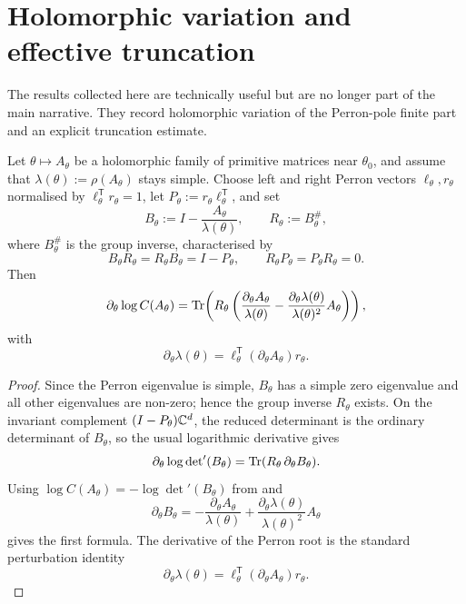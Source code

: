\section{Holomorphic variation and effective truncation}
\label{app:variation}

The results collected here are technically useful but are no longer part of the main narrative. They record holomorphic variation of the Perron-pole finite part and an explicit truncation estimate.

\begin{theorem}
  \label{thm:finite-part-reduced-determinant-group-inverse-gradient}
  Let \(\theta\mapsto A_\theta\) be a holomorphic family of primitive
  matrices near \(\theta_0\), and assume that
  \(\lambda(\theta):=\rho(A_\theta)\) stays simple. Choose left and
  right Perron vectors \(\ell_\theta,r_\theta\) normalised by
  \(\ell_\theta^{\mathsf T}r_\theta=1\), let
  \(P_\theta:=r_\theta\ell_\theta^{\mathsf T}\), and set
  \[
    B_\theta:=I-\frac{A_\theta}{\lambda(\theta)},
    \qquad
    R_\theta:=B_\theta^{\#},
  \]
  where \(B_\theta^{\#}\) is the group inverse, characterised by
  \[
    B_\theta R_\theta=R_\theta B_\theta=I-P_\theta,
    \qquad
    R_\theta P_\theta=P_\theta R_\theta=0.
  \]
  Then
  \[
    \partial_\theta\log C(A_\theta)
    =\operatorname{Tr}\!\left(
      R_\theta\left(
        \frac{\partial_\theta A_\theta}{\lambda(\theta)}
        -\frac{\partial_\theta\lambda(\theta)}{\lambda(\theta)^2}
         A_\theta\right)\right),
  \]
  with
  \[
    \partial_\theta\lambda(\theta)
    =\ell_\theta^{\mathsf T}(\partial_\theta A_\theta)r_\theta.
  \]
\end{theorem}

\begin{proof}
  Since the Perron eigenvalue is simple, \(B_\theta\) has a simple zero
  eigenvalue and all other eigenvalues are non-zero; hence the group
  inverse \(R_\theta\) exists. On the invariant complement
  \((I-P_\theta)\mathbb{C}^d\), the reduced determinant is the ordinary
  determinant of \(B_\theta\), so the usual logarithmic derivative gives
  \[
    \partial_\theta \log\det\nolimits'(B_\theta)
    =\operatorname{Tr}(R_\theta\,\partial_\theta B_\theta).
  \]
  Using \(\log C(A_\theta)=-\log\det\nolimits'(B_\theta)\) from
   and
  \[
    \partial_\theta B_\theta
    =-\frac{\partial_\theta A_\theta}{\lambda(\theta)}
      +\frac{\partial_\theta\lambda(\theta)}{\lambda(\theta)^2}A_\theta
  \]
  gives the first formula. The derivative of the Perron root is the
  standard perturbation identity
  \[
    \partial_\theta\lambda(\theta)
    =\ell_\theta^{\mathsf T}(\partial_\theta A_\theta)r_\theta.
  \]
\end{proof}

